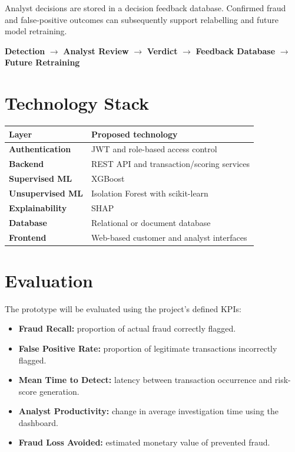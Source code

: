 \documentclass[11pt,a4paper]{article}
\begin{document}
Analyst decisions are stored in a decision feedback database. Confirmed fraud and false-positive
outcomes can subsequently support relabelling and future model retraining.

\begin{center}
\textbf{Detection}
$\rightarrow$
\textbf{Analyst Review}
$\rightarrow$
\textbf{Verdict}
$\rightarrow$
\textbf{Feedback Database}
$\rightarrow$
\textbf{Future Retraining}
\end{center}

\section{Technology Stack}

\begin{center}
\begin{tabularx}{0.92\textwidth}{>{\bfseries}p{}X}
\toprule
Layer & Proposed technology\\
\midrule
Authentication & JWT and role-based access control\\
Backend & REST API and transaction/scoring services\\
Supervised ML & XGBoost\\
Unsupervised ML & Isolation Forest with scikit-learn\\
Explainability & SHAP\\
Database & Relational or document database\\
Frontend & Web-based customer and analyst interfaces\\
\bottomrule
\end{tabularx}
\end{center}

\section{Evaluation}

The prototype will be evaluated using the project's defined KPIs:

\begin{itemize}[leftmargin=1.4em,itemsep=2pt]
\item \textbf{Fraud Recall:} proportion of actual fraud correctly flagged.
\item \textbf{False Positive Rate:} proportion of legitimate transactions incorrectly flagged.
\item \textbf{Mean Time to Detect:} latency between transaction occurrence and risk-score generation.
\item \textbf{Analyst Productivity:} change in average investigation time using the dashboard.
\item \textbf{Fraud Loss Avoided:} estimated monetary value of prevented fraud.
\end{itemize}
\end{document}
